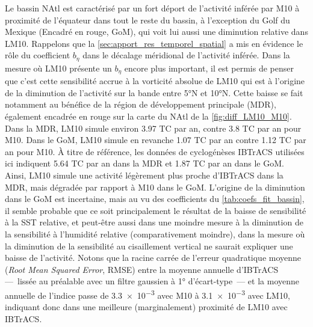 \documentclass[../main.tex]{subfiles}
\begin{document}
Le bassin NAtl est caractérisé par un fort déport de l'activité inférée par M10 à proximité de l'équateur dans tout le reste du bassin, à l'exception du Golf du
Mexique (Encadré en rouge, GoM), qui voit lui aussi une diminution relative dans LM10. Rappelons que la \cref{sec:apport_res_temporel_spatial} a mis en évidence
le rôle du coefficient $b_\eta$ dans le décalage méridional de l'activité inférée. Dans la mesure où LM10 présente un $b_\eta$ encore plus important, il est
permis de penser que c'est cette sensibilité accrue à la vorticité absolue de LM10 qui est à l'origine de la diminution de l'activité sur la bande entre
\ang{5}N et \ang{10}N. Cette baisse se fait notamment au bénéfice de la région de développement principale (MDR), également encadrée en rouge sur la carte du
NAtl de la \cref{fig:diff_LM10_M10}. Dans la MDR, LM10 simule environ \num{3.97} TC par an, contre \num{3.8} TC par an pour M10. Dans le GoM, LM10 simule en
revanche \num{1.07} TC par an contre \num{1.12} TC par an pour M10. À titre de référence, les données de cyclogénèses IBTrACS utilisées ici indiquent \num{5.64}
TC par an dans la MDR et \num{1.87} TC par an dans le GoM. Ainsi, LM10 simule une activité légèrement plus proche d'IBTrACS dans la MDR, mais dégradée par
rapport à M10 dans le GoM. L'origine de la diminution dans le GoM est incertaine, mais au vu des coefficients du \cref{tab:coefs_fit_bassin}, il semble
probable que ce soit principalement le résultat de la baisse de sensibilité à la SST relative, et peut-être aussi dans une moindre mesure à la diminution de la
sensibilité à l'humidité relative (comparativement moindre), dans la mesure où la diminution de la sensibilité au cisaillement vertical ne saurait expliquer une
baisse de l'activité. Notons que la racine carrée de l'erreur quadratique moyenne (\textit{Root Mean Squared Error}, RMSE) entre la moyenne annuelle d'IBTrACS
---~lissée au préalable avec un filtre gaussien à \ang{1} d'écart-type~--- et la moyenne annuelle de l'indice passe de \num{3.3e-3} avec M10 à \num{3.1e-3} avec
LM10, indiquant donc dans une meilleure (marginalement) proximité de LM10 avec IBTrACS.
\end{document}
